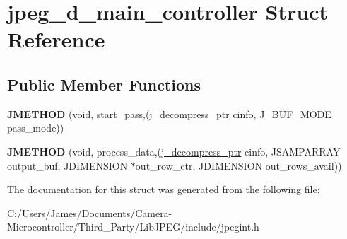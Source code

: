 \hypertarget{structjpeg__d__main__controller}{}\section{jpeg\+\_\+d\+\_\+main\+\_\+controller Struct Reference}
\label{structjpeg__d__main__controller}
\subsection*{Public Member Functions}
\begin{DoxyCompactItemize}
\item 
\mbox{\label{structjpeg__d__main__controller_ace9537865f660119b682154abb6b8f48}} 
{\bfseries J\+M\+E\+T\+H\+OD} (void, start\+\_\+pass,(\hyperlink{structjpeg__decompress__struct}{j\+\_\+decompress\+\_\+ptr} cinfo, J\+\_\+\+B\+U\+F\+\_\+\+M\+O\+DE pass\+\_\+mode))
\item 
\mbox{\label{structjpeg__d__main__controller_a86e7aefc447d73ca76d484b1cbef97e8}} 
{\bfseries J\+M\+E\+T\+H\+OD} (void, process\+\_\+data,(\hyperlink{structjpeg__decompress__struct}{j\+\_\+decompress\+\_\+ptr} cinfo, J\+S\+A\+M\+P\+A\+R\+R\+AY output\+\_\+buf, J\+D\+I\+M\+E\+N\+S\+I\+ON $\ast$out\+\_\+row\+\_\+ctr, J\+D\+I\+M\+E\+N\+S\+I\+ON out\+\_\+rows\+\_\+avail))
\end{DoxyCompactItemize}


The documentation for this struct was generated from the following file\+:\begin{DoxyCompactItemize}
\item 
C\+:/\+Users/\+James/\+Documents/\+Camera-\/\+Microcontroller/\+Third\+\_\+\+Party/\+Lib\+J\+P\+E\+G/include/jpegint.\+h\end{DoxyCompactItemize}
